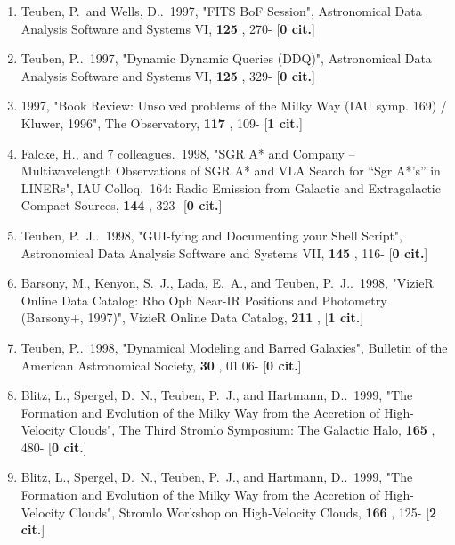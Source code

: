 \documentclass[11pt,letterpaper]{article}
\begin{document}
\begin{enumerate}[resume,label=\textbf{\arabic*}.]
\item  
Teuben, P.~and Wells, D..\  1997,  "FITS BoF Session", Astronomical Data 
Analysis Software and Systems VI,  {\bf 125} , 270- [{\bf 0 cit.}] 

\item  
Teuben, P..\  1997,  "Dynamic Dynamic Queries (DDQ)", Astronomical Data 
Analysis Software and Systems VI,  {\bf 125} , 329- [{\bf 0 cit.}] 

\item  
 1997,  "Book Review: Unsolved problems of the Milky Way (IAU symp. 169) / 
Kluwer, 1996", The Observatory,  {\bf 117} , 109- [{\bf 1 cit.}] 

\item  
Falcke, H., and 7 colleagues.\  1998,  "SGR A* and Company -- 
Multiwavelength Observations of SGR A* and VLA Search for ``Sgr A*'s'' in 
LINERs", IAU Colloq.~164: Radio Emission from Galactic and Extragalactic 
Compact Sources,  {\bf 144} , 323- [{\bf 0 cit.}] 

\item  
Teuben, P.~J..\  1998,  "GUI-fying and Documenting your Shell Script", 
Astronomical Data Analysis Software and Systems VII,  {\bf 145} , 116- 
[{\bf 0 cit.}] 


\item  
Barsony, M., Kenyon, S.~J., Lada, E.~A., and Teuben, P.~J..\  1998,  
"VizieR Online Data Catalog: Rho Oph Near-IR Positions and Photometry 
(Barsony+, 1997)", VizieR Online Data Catalog,  {\bf 211} ,  [{\bf 1 cit.}] 

\item  
Teuben, P..\  1998,  "Dynamical Modeling and Barred Galaxies", Bulletin of 
the American Astronomical Society,  {\bf 30} , 01.06- [{\bf 0 cit.}] 

\item  
Blitz, L., Spergel, D.~N., Teuben, P.~J., and Hartmann, D..\  1999,  "The 
Formation and Evolution of the Milky Way from the Accretion of 
High-Velocity Clouds", The Third Stromlo Symposium: The Galactic Halo,  
{\bf 165} , 480- [{\bf 0 cit.}] 

\item  
Blitz, L., Spergel, D.~N., Teuben, P.~J., and Hartmann, D..\  1999,  "The 
Formation and Evolution of the Milky Way from the Accretion of 
High-Velocity Clouds", Stromlo Workshop on High-Velocity Clouds,  {\bf 166} 
, 125- [{\bf 2 cit.}] 


\end{enumerate}
\end{document}
